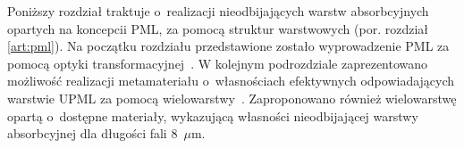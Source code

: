 Poniższy rozdział traktuje o~realizacji nieodbijających warstw absorbcyjnych opartych na koncepcii PML, za pomocą struktur warstwowych (por. rozdział \ref{art:pml}). Na początku rozdziału przedstawione zostało wyprowadzenie PML za pomocą optyki transformacyjnej~\cite{pendry2012transformation}. W kolejnym podrozdziale zaprezentowano możliwość realizacji metamateriału o~własnościach efektywnych odpowiadających warstwie UPML za pomocą wielowarstwy~\cite{ania2015}. Zaproponowano również wielowarstwę opartą o~dostępne materiały, wykazującą własności nieodbijającej warstwy absorbcyjnej dla długości fali $8$~$\mu$m.


